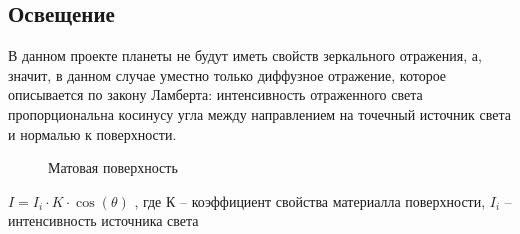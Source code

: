\documentclass[a4paper,14pt]{extreport}
\begin{document}
		\subsection{Освещение}
 В данном проекте планеты не будут иметь
свойств зеркального отражения, а, значит, в данном случае уместно только
диффузное отражение, которое описывается по закону Ламберта:
интенсивность отраженного света пропорциональна косинусу угла между
направлением на точечный источник света и нормалью к поверхности.
		\begin{figure}[H]
		\caption{Матовая поверхность}
		\label{ris:image}
		\end{figure}
		\begin{center}
		\begin{math}
		I = I_i \cdot K \cdot \cos (\theta)
		\end{math}
		, где К -- коэффициент свойства материалла поверхности,
		\begin{math}
		I_i
		\end{math}
		-- интенсивность источника света
		\end{center}
\end{document}
